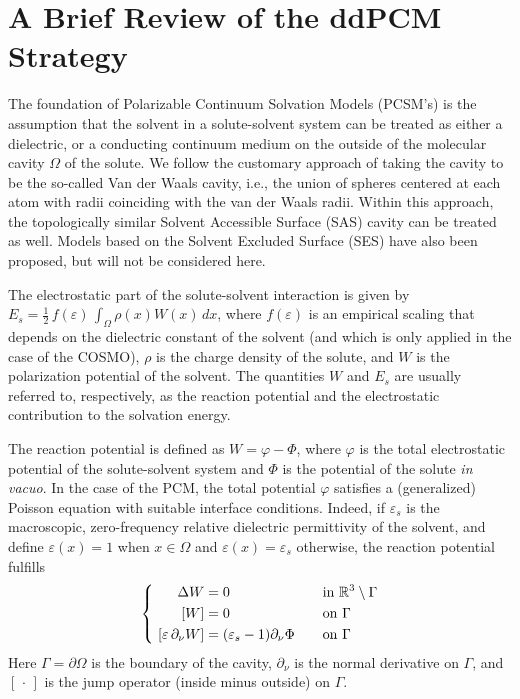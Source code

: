 \section{A Brief Review of the ddPCM Strategy}\label{sec:review}

The foundation of Polarizable Continuum Solvation Models (PCSM's) is the assumption that the solvent in a solute-solvent system can be treated as either a dielectric, or a conducting continuum medium on the outside of the molecular cavity $\Omega$ of the solute. We follow the customary approach of taking the cavity to be the so-called Van der Waals cavity\cite{ReviewPCM_2005}, i.e., the union of spheres centered at each atom with radii coinciding with the van der Waals radii.
Within this approach, the topologically similar Solvent Accessible Surface (SAS) cavity can be treated as well. 
Models based on the Solvent Excluded Surface (SES) have also been proposed\cite{Quan_DDPCM_SES,C5CP03410H,Harbrecht2011,JCC:JCC21431}, but will not be considered here.

The electrostatic part of the solute-solvent interaction is given by $E_s = \tfrac{1}{2}\, f(\varepsilon)\,\int_\Omega \rho(x) W(x) \, dx$, where $f(\varepsilon)$ is an empirical scaling that depends on the dielectric constant of the solvent (and which is only applied in the case of the COSMO), $\rho$ is the charge density of the solute, and $W$ is the polarization potential of the solvent. The quantities $W$ and $E_s$ are usually referred to, respectively, as the reaction potential and the electrostatic contribution to the solvation energy. 

The reaction potential is defined as $W = \varphi - \Phi$, where $\varphi$ is the total electrostatic potential of the solute-solvent system and $\Phi$ is the potential of the solute \emph{in vacuo}. In the case of the PCM, the total potential $\varphi$ satisfies a (generalized) Poisson equation with suitable interface conditions\cite{Mennucci_JCP_IEF1,Mennucci_JMC_IEF2}. Indeed, if $\varepsilon_s$ is the macroscopic, zero-frequency relative dielectric permittivity of the solvent, and define $\varepsilon(x) = 1$ when $x \in \Omega$ and $\varepsilon(x) = \varepsilon_s$ otherwise, the reaction potential fulfills 
\begin{equation} 
\label{eq:pcmpde}
\left \{ 
\begin{alignedat}{4}
\Delta  W &= 0  &&\mbox{in } \mathbb{R}^3\setminus \Gamma  \\
 \ [W] &= 0  &&\mbox{on } \Gamma\\
\  [\varepsilon \, \partial_\nu W] &= (\varepsilon_s-1) \partial_\nu \Phi &\qquad& \mbox{on } \Gamma
\end{alignedat} 
\right.
\end{equation}
Here $\Gamma=\partial\Omega$ is the boundary of the cavity, $\partial_\nu$ is the normal derivative on $\Gamma$, and $[\,\cdot\,]$ is the jump operator (inside minus outside) on $\Gamma$.

